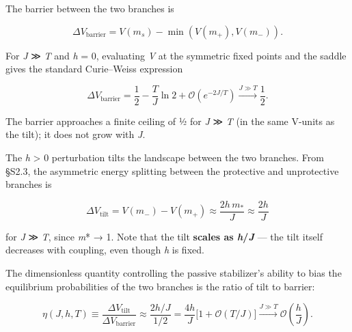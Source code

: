\documentclass[11pt,letterpaper]{article}
\begin{document}
The barrier between the two branches is

\[
\Delta V_{\text{barrier}} = V(m_s) - \min(V(m_+), V(m_-)).
\]

For \emph{J} ≫ \emph{T} and \emph{h} = 0, evaluating \emph{V} at the symmetric fixed points and the saddle gives the standard Curie--Weiss expression


\begin{equation*}
\Delta V_{\text{barrier}} = \frac{1}{2} - \frac{T}{J}\ln 2 + \mathcal{O}\!\left(e^{-2J/T}\right) \xrightarrow{J \gg T} \frac{1}{2}. \tag{S4}
\end{equation*}


The barrier approaches a finite ceiling of ½ for \emph{J} ≫ \emph{T} (in the same V-units as the tilt); it does not grow with \emph{J}.

The \emph{h} \textgreater{} 0 perturbation tilts the landscape between the two branches. From §S2.3, the asymmetric energy splitting between the protective and unprotective branches is


\begin{equation*}
\Delta V_{\text{tilt}} = V(m_-) - V(m_+) \approx \frac{2 h\,m_*}{J} \approx \frac{2 h}{J} \tag{S5}
\end{equation*}


for \emph{J} ≫ \emph{T}, since \emph{m}* → 1. Note that the tilt \textbf{scales as \emph{h}/\emph{J}} --- the tilt itself decreases with coupling, even though \emph{h} is fixed.

The dimensionless quantity controlling the passive stabilizer's ability to bias the equilibrium probabilities of the two branches is the ratio of tilt to barrier:


\begin{equation*}
\eta(J, h, T) \equiv \frac{\Delta V_{\text{tilt}}}{\Delta V_{\text{barrier}}} \approx \frac{2h/J}{1/2} = \frac{4h}{J}\bigl[1 + \mathcal{O}(T/J)\bigr] \xrightarrow{J \gg T} \mathcal{O}\!\left(\frac{h}{J}\right). \tag{S6}
\end{equation*}
\end{document}
